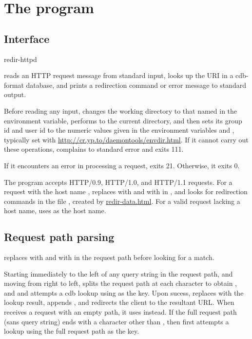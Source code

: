 
\chapter{The  program}

\section{Interface}
\begin{code}
  redir-httpd
\end{code}

 reads an HTTP request message from standard input,
looks up the URI in a cdb-format database, and prints a redirection
command or error message to standard output.

Before reading any input,  changes the working
directory to that named in the  environment variable,
performs  to the current directory, and then sets its
group id and user id to the numeric values given in the environment
variables  and , typically set with
\href{\cmd{envdir}}{http://cr.yp.to/daemontools/envdir.html}.
If it cannot carry out these operations,  complains
to standard error and exits 111.

If it encounters an error in processing a request, 
exits 21.  Otherwise, it exits 0.

The  program accepts HTTP/0.9, HTTP/1.0, and HTTP/1.1 requests.
For a request with the host name ,  replaces
 with \cmd{/:} and \cmd{//} with \cmd{/} in , and
looks for redirection commands in the file , created
by \href{\cmd{redir-data}}{redir-data.html}.  For a valid request lacking a host
name,  uses  as the host name.

\section{Request path parsing}

 replaces  with \cmd{/:} and \cmd{//} with \cmd{/} in
the request path before looking for a match.

Starting immediately to the left of any query string in the request path,
and moving from right to left,
splits the request path at each \cmd{/} character to obtain
,
and and attempts a cdb lookup using
as the key.
Upon sucess,
replaces
with the lookup result, appends
,
and redirects the client to the resultant URL.
When
receives a request with an empty path, it uses
\cmd{/}
instead.
If the full request path (sans query string) ends with a
character other than
\cmd{/},
then
first attempts a lookup using the full request path as the key.

